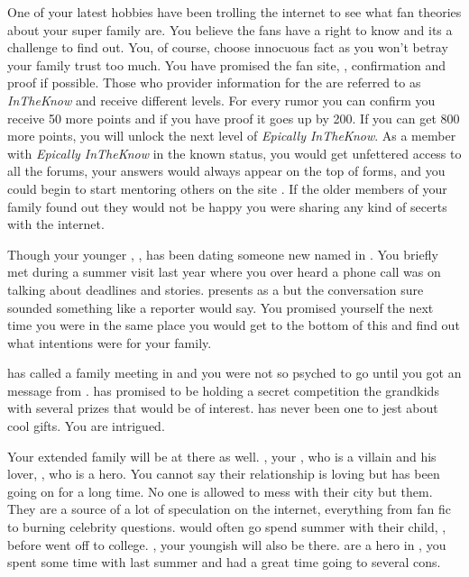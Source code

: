 \documentclass[char]{LRSguildcamp1}
\begin{document}
One of your latest hobbies have been trolling the internet to see what fan theories about your super family are. You believe the fans have a right to know and its a challenge to find out. You, of course, choose innocuous fact as you won't betray your family trust too much. You have promised the fan site, \pTweenwebsite{}, confirmation and proof if possible. Those who provider information for the \pTweenwebsite{} are referred to as \textsl{InTheKnow} and receive different levels.  For every rumor you can confirm you receive 50 more points and if you have proof it goes up by 200. If you can get 800 more points, you will unlock the next level of \textit{Epically InTheKnow}. As a member with \textit{Epically InTheKnow} in the known status, you would get unfettered access to all the forums, your answers would always appear on the top of forms, and you could begin to start mentoring others on the site \pTweenwebsite{}. If the older members of your family found out they would not be happy you were sharing any kind of secerts with the internet. 

Though your younger \cYoungest{\uncle}, \cYoungest{}, has been dating someone new  \cAS{\hero} named \cAS{} in \pCityYoungest{}. You briefly met \cAS{} during a summer visit last year where you over heard a phone call \cAS{\they} was on talking about deadlines and stories. \cAS{} presents as a \cAS{\hero} but the conversation sure sounded something like a reporter would say. You promised yourself the next time you were in the same place you would get to the bottom of this and find out what \cAS{\their} intentions were for your family.

\cGrandma{} has called a family meeting in \pCityGrandma{} and you were not so psyched to go until you got an message from \cGrandma{}. \cGrandma{\they} has promised to be holding a secret competition the grandkids with several prizes that would be of interest. \cGrandma{} has never been one to jest about cool gifts. You are intrigued.  

Your extended family will be at there as well. \cOldest{}, your \cOldest{\uncle}, who is a villain and his lover, \cOS{}, who is a hero. You cannot say their relationship is loving but has been going on for a long time. No one is allowed to mess with their city but them. They are a source of a lot of speculation on the internet, everything from fan fic to burning celebrity questions. \cTeen{} would often go spend summer with their child, \cGrad{}, before \cGrad{\they} went off to college.  \cYoungest{}, your youngish \cYoungest{\uncle} will also be there.  are a hero in \pCityYoungest{}, you spent some time with \cYoungest{\them} last summer and had a great time going to several cons.  
\end{document}

